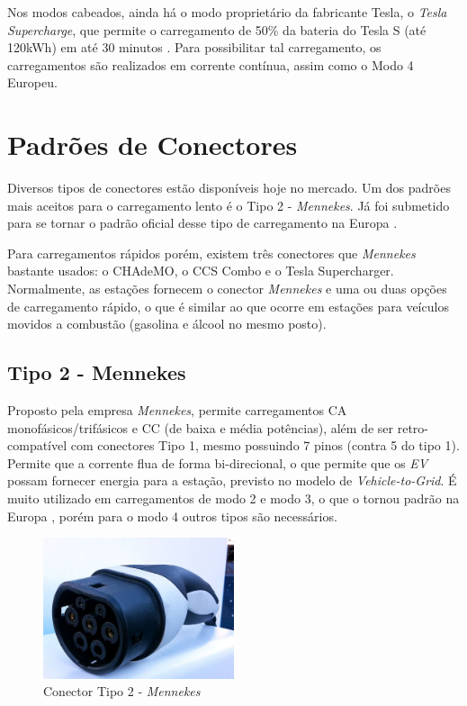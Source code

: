         Nos modos cabeados, ainda há o modo proprietário da fabricante Tesla, o \textit{Tesla Supercharge}, que permite o carregamento de 50\% da bateria do Tesla S (até 120kWh) em até 30 minutos \cite{tesla-supercharge}. Para possibilitar tal carregamento, os carregamentos são realizados em corrente contínua, assim como o Modo 4 Europeu.

  \section{Padrões de Conectores}
  \label{stateofart:plugs}

      Diversos tipos de conectores estão disponíveis hoje no mercado. Um dos padrões mais aceitos para o carregamento lento é o Tipo 2 - \textit{Mennekes}. Já foi submetido para se tornar o padrão oficial desse tipo de carregamento na Europa \cite{mckinsey-report-ev}.

      Para carregamentos rápidos porém, existem três conectores que \textit{Mennekes} bastante usados: o CHAdeMO, o CCS Combo e o Tesla Supercharger. Normalmente, as estações fornecem o conector \textit{Mennekes} e uma ou duas opções de carregamento rápido, o que é similar ao que ocorre em estações para veículos movidos a combustão (gasolina e álcool no mesmo posto).

      \subsection{Tipo 2 - Mennekes}
      \label{stateofart:plugs:mennekes}

        Proposto pela empresa \textit{Mennekes}, permite carregamentos \ac{CA} monofásicos/trifásicos e \ac{CC} (de baixa e média potências), além de ser retro-compatível com conectores Tipo 1, mesmo possuindo 7 pinos (contra 5 do tipo 1). Permite que a corrente flua de forma bi-direcional, o que permite que os \textit{\ac{EV}} possam fornecer energia para a estação, previsto no modelo de \textit{Vehicle-to-Grid}. É muito utilizado em carregamentos de modo 2 e modo 3, o que o tornou padrão na Europa \cite{mennekes-news-standardplug}, porém para o modo 4 outros tipos são necessários.

        \begin{figure}[H]
          \begin{center}
            \includegraphics[width=0.50\textwidth,natwidth=1024,natheight=755]{assets/images/connectors-mennekes.jpg}
            \caption{Conector Tipo 2 - \textit{Mennekes}}
            \label{fig:mennekes}
          \end{center}
        \end{figure}

